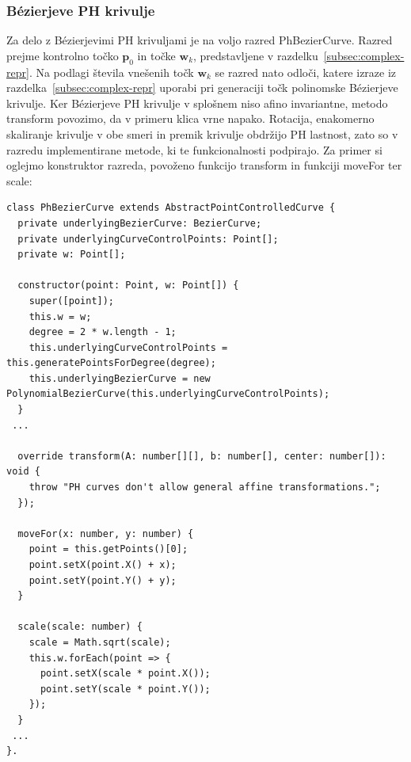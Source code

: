 \documentclass[isrm2, tisk]{fmfdelo}
\newcommand{\p}{\mathbf{p}}
\begin{document}
    \subsubsection*{Bézierjeve PH krivulje}
    Za delo z Bézierjevimi PH krivuljami je na voljo razred PhBezierCurve.
    Razred prejme kontrolno točko $\p_0$ in točke $\mathbf{w}_k$, predstavljene v razdelku~\ref{subsec:complex-repr}.
    Na podlagi števila vnešenih točk $\mathbf{w}_k$ se razred nato odloči, katere izraze iz razdelka~\ref{subsec:complex-repr} uporabi pri generaciji točk polinomske Bézierjeve krivulje.
    Ker Bézierjeve PH krivulje v splošnem niso afino invariantne, metodo transform povozimo, da v primeru klica vrne napako.
    Rotacija, enakomerno skaliranje krivulje v obe smeri in premik krivulje obdržijo PH lastnost, zato so v razredu implementirane metode, ki te funkcionalnosti podpirajo.
    Za primer si oglejmo konstruktor razreda, povoženo funkcijo transform in funkciji moveFor ter scale:
    \begin{lstlisting}
class PhBezierCurve extends AbstractPointControlledCurve {
  private underlyingBezierCurve: BezierCurve;
  private underlyingCurveControlPoints: Point[];
  private w: Point[];

  constructor(point: Point, w: Point[]) {
    super([point]);
    this.w = w;
    degree = 2 * w.length - 1;
    this.underlyingCurveControlPoints = this.generatePointsForDegree(degree);
    this.underlyingBezierCurve = new PolynomialBezierCurve(this.underlyingCurveControlPoints);
  }
 ...

  override transform(A: number[][], b: number[], center: number[]): void {
    throw "PH curves don't allow general affine transformations.";
  });

  moveFor(x: number, y: number) {
    point = this.getPoints()[0];
    point.setX(point.X() + x);
    point.setY(point.Y() + y);
  }

  scale(scale: number) {
    scale = Math.sqrt(scale);
    this.w.forEach(point => {
      point.setX(scale * point.X());
      point.setY(scale * point.Y());
    });
  }
 ...
}.
    \end{lstlisting}
\end{document}
